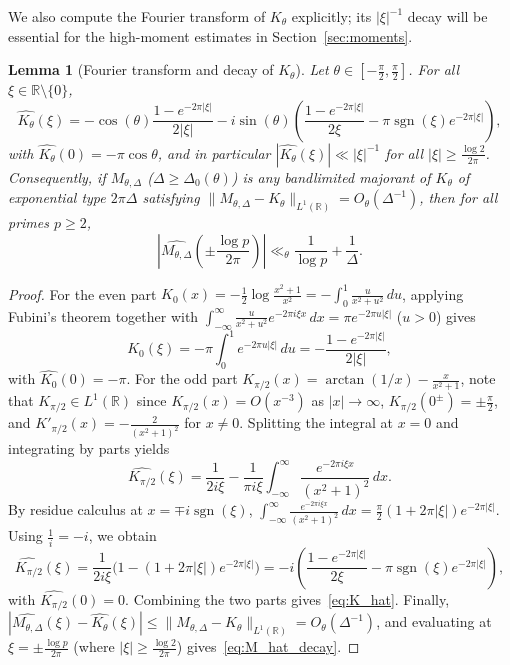 \documentclass[11pt,a4paper]{amsart}
\newtheorem{lemma}[theorem]{Lemma}
\theoremstyle{remark}
\numberwithin{equation}{section}
\newcommand{\R}{\mathbb{R}}
\DeclareMathOperator{\sgn}{sgn}
\begin{document}
We also compute the Fourier transform of $K_\theta$ explicitly; its $|\xi|^{-1}$ decay will be essential for the high-moment estimates in Section~\ref{sec:moments}.

\begin{lemma}[Fourier transform and decay of $K_\theta$]\label{lem:K_fourier}
Let $\theta \in [-\frac{\pi}{2},\frac{\pi}{2}]$. For all $\xi \in \R\setminus\{0\}$,
\begin{equation}\label{eq:K_hat}
  \widehat{K_\theta}(\xi) = -\cos(\theta)\frac{1-e^{-2\pi|\xi|}}{2|\xi|} - i\sin(\theta)\left(\frac{1-e^{-2\pi|\xi|}}{2\xi} - \pi\sgn(\xi)e^{-2\pi|\xi|}\right),
\end{equation}
with $\widehat{K_\theta}(0) = -\pi\cos\theta$, and in particular $|\widehat{K_\theta}(\xi)| \ll |\xi|^{-1}$ for all $|\xi| \ge \frac{\log 2}{2\pi}$. Consequently, if $M_{\theta,\Delta}$ ($\Delta \ge \Delta_0(\theta)$) is any bandlimited majorant of $K_\theta$ of exponential type $2\pi\Delta$ satisfying $\|M_{\theta,\Delta} - K_\theta\|_{L^1(\R)} = O_\theta(\Delta^{-1})$, then for all primes $p \ge 2$,
\begin{equation}\label{eq:M_hat_decay}
  \left|\widehat{M_{\theta,\Delta}}\!\left(\pm\frac{\log p}{2\pi}\right)\right| \ll_\theta \frac{1}{\log p} + \frac{1}{\Delta}.
\end{equation}
\end{lemma}

\begin{proof}
For the even part $K_0(x) = -\frac{1}{2}\log\frac{x^2+1}{x^2} = -\int_0^1 \frac{u}{x^2+u^2}\,du$, applying Fubini's theorem together with $\int_{-\infty}^\infty \frac{u}{x^2+u^2}e^{-2\pi i\xi x}\,dx = \pi e^{-2\pi u|\xi|}$ ($u > 0$) gives
\[
  \widehat{K_0}(\xi) = -\pi\int_0^1 e^{-2\pi u|\xi|}\,du = -\frac{1-e^{-2\pi|\xi|}}{2|\xi|},
\]
with $\widehat{K_0}(0) = -\pi$. For the odd part $K_{\pi/2}(x) = \arctan(1/x) - \frac{x}{x^2+1}$, note that $K_{\pi/2} \in L^1(\R)$ since $K_{\pi/2}(x) = O(x^{-3})$ as $|x|\to\infty$, $K_{\pi/2}(0^\pm) = \pm\frac{\pi}{2}$, and $K'_{\pi/2}(x) = -\frac{2}{(x^2+1)^2}$ for $x \neq 0$. Splitting the integral at $x = 0$ and integrating by parts yields
\[
  \widehat{K_{\pi/2}}(\xi) = \frac{1}{2i\xi} - \frac{1}{\pi i\xi}\int_{-\infty}^\infty \frac{e^{-2\pi i\xi x}}{(x^2+1)^2}\,dx.
\]
By residue calculus at $x = \mp i\sgn(\xi)$, $\int_{-\infty}^\infty \frac{e^{-2\pi i\xi x}}{(x^2+1)^2}\,dx = \frac{\pi}{2}(1+2\pi|\xi|)e^{-2\pi|\xi|}$. Using $\frac{1}{i} = -i$, we obtain
\[
  \widehat{K_{\pi/2}}(\xi) = \frac{1}{2i\xi}\bigl(1 - (1+2\pi|\xi|)e^{-2\pi|\xi|}\bigr) = -i\left(\frac{1-e^{-2\pi|\xi|}}{2\xi} - \pi\sgn(\xi)e^{-2\pi|\xi|}\right),
\]
with $\widehat{K_{\pi/2}}(0) = 0$. Combining the two parts gives~\eqref{eq:K_hat}. Finally, $|\widehat{M_{\theta,\Delta}}(\xi) - \widehat{K_\theta}(\xi)| \le \|M_{\theta,\Delta} - K_\theta\|_{L^1(\R)} = O_\theta(\Delta^{-1})$, and evaluating at $\xi = \pm\frac{\log p}{2\pi}$ (where $|\xi| \ge \frac{\log 2}{2\pi}$) gives~\eqref{eq:M_hat_decay}.
\end{proof}
\end{document}
